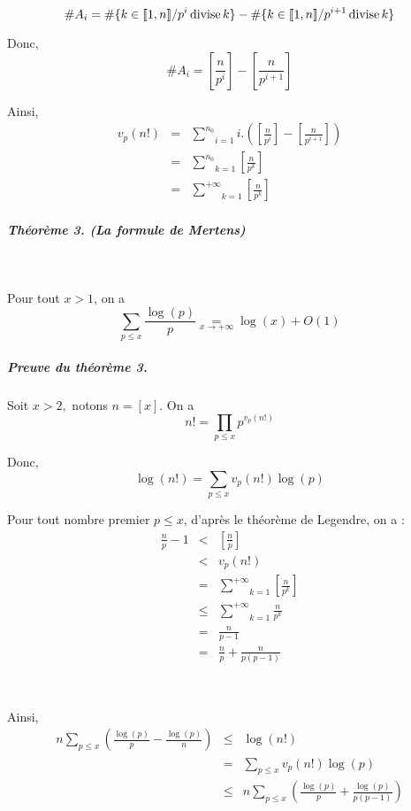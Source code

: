 \[ \#A_i =\# \{ k \in \llbracket 1, n \rrbracket / p^i \operatorname{divise} k \} -\#
   \{ k \in \llbracket 1, n \rrbracket / p^{i + 1} \operatorname{divise} k \} \]


Donc,
\[ \#A_i = \left[ \frac{n}{p^i} \right] - \left[ \frac{n}{p^{i + 1}} \right]
\]


Ainsi,
\begin{eqnarray*}
  v_p (n!) & = & \underset{i = 1}{\overset{n_0}{\sum}} i. \left( \left[
  \frac{n}{p^i} \right] - \left[ \frac{n}{p^{i + 1}} \right] \right)\\
  & = & \underset{k = 1}{\overset{n_0}{\sum}} \left[ \frac{n}{p^k} \right]\\
  & = & \underset{k = 1}{\overset{+ \infty}{\sum}} \left[ \frac{n}{p^k}
  \right]
\end{eqnarray*}


\subparagraph{Th{\'e}or{\`e}me 3. (La formule de Mertens)}

\

Pour tout $x > 1$, on a
\[ \underset{p \leqslant x}{\sum} \frac{\log (p)}{p} \underset{x \rightarrow +
   \infty}{=} \log (x) + O (1) \]


\subparagraph{Preuve du th{\'e}or{\`e}me 3.}

Soit $x > 2,$ notons $n = [x]$. On a
\[ n! = \underset{p \leqslant x}{\prod} p^{v_p (n!)} \]


Donc,
\[ \log (n!) = \underset{p \leqslant x}{\sum} v_p (n!) \log (p)  \]


Pour tout nombre premier $p \leqslant x$, d'apr{\`e}s le th{\'e}or{\`e}me de
Legendre, on a :
\begin{eqnarray*}
  \frac{n}{p} - 1 & < & \left[ \frac{n}{p} \right]\\
  & < & v_p (n!)\\
  & = & \underset{k = 1}{\overset{+ \infty}{\sum}} \left[ \frac{n}{p^k}
  \right]\\
  & \leqslant & \underset{k = 1}{\overset{+ \infty}{\sum}} \frac{n}{p^k}\\
  & = & \frac{n}{p - 1}\\
  & = & \frac{n}{p} + \frac{n}{p (p - 1)}
\end{eqnarray*}


\

Ainsi,
\begin{eqnarray*}
  n \underset{p \leqslant x}{\sum} \left( \frac{\log (p)}{p} - \frac{\log
  (p)}{n} \right) & \leqslant & \log (n!)\\
  & = & \underset{p \leqslant x}{\sum} v_p (n!) \log (p)\\
  & \leqslant & n \underset{p \leqslant x}{\sum} \left( \frac{\log (p)}{p} +
  \frac{\log (p)}{p (p - 1)} \right)
\end{eqnarray*}


